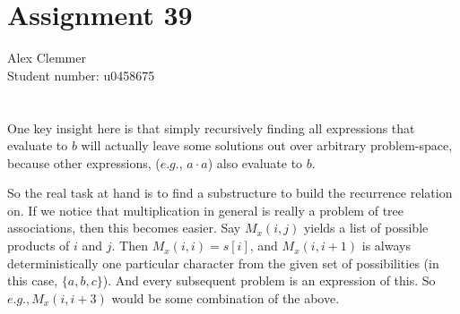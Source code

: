 \documentclass[a4paper]{article}
\begin{document}
\section*{Assignment 39}
Alex Clemmer\\
Student number: u0458675

\section{}



One key insight here is that simply recursively finding all expressions that evaluate to $b$ will actually leave some solutions out over arbitrary problem-space, because other expressions, ($\textit{e.g.}$, $a \cdot a$) also evaluate to $b$.

So the real task at hand is to find a substructure to build the recurrence relation on. If we notice that multiplication in general is really a problem of tree associations, then this becomes easier. Say $M_x(i,j)$ yields a list of possible products of $i$ and $j$. Then $M_x(i,i) = s[i]$, and $M_x(i,i+1)$ is always deterministically one particular character from the given set of possibilities (in this case, $\{a, b, c\}$). And every subsequent problem is an expression of this. So $\textit{e.g.}, M_x(i, i+3)$ would be some combination of the above.
\end{document}
